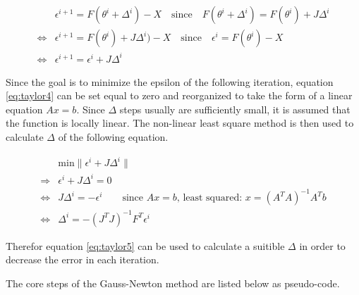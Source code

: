 \begin{align}
	& \epsilon^{i+1} = F(\theta^{i} + \Delta^{i}) - X \quad \text{since} \quad F(\theta^{i} + \Delta^{i}) = F(\theta^{i}) + J \Delta^{i} \\
	\Leftrightarrow & \epsilon^{i+1} = F(\theta^{i}) + J \Delta^{i}) - X \quad \text{since} \quad \epsilon^{i} = F(\theta^{i}) - X \\
	\Leftrightarrow & \epsilon^{i+1} = \epsilon^{i} + J \Delta^{i} \label{eq:taylor4}
\end{align}

Since the goal is to minimize the epsilon of the following iteration, equation \ref*{eq:taylor4} can be set equal to zero and reorganized to
take the form of a linear equation $Ax = b$. Since $\Delta$ steps usually are sufficiently small, it is assumed that the function is locally
linear. The non-linear least square method is then used to calculate $\Delta$ of the following equation.

\begin{align}
	&\text{min} \| \epsilon^{i} + J \Delta^{i} \| \\
	\Rightarrow & \epsilon^{i} + J \Delta^{i} = 0 \\
	\Leftrightarrow & J \Delta^{i} = -\epsilon^{i} \qquad \text{since $Ax = b$, least squared: } x = (A^T A)^{-1} A^T b \\
	\Leftrightarrow & \Delta^{i} = - (J^T J)^{-1} F^T \epsilon^{i} \label{eq:taylor5}
\end{align}

Therefor equation \ref*{eq:taylor5} can be used to calculate a suitible $\Delta$ in order to decrease the error in each iteration. \newline

The core steps of the Gauss-Newton method are listed below as pseudo-code.



